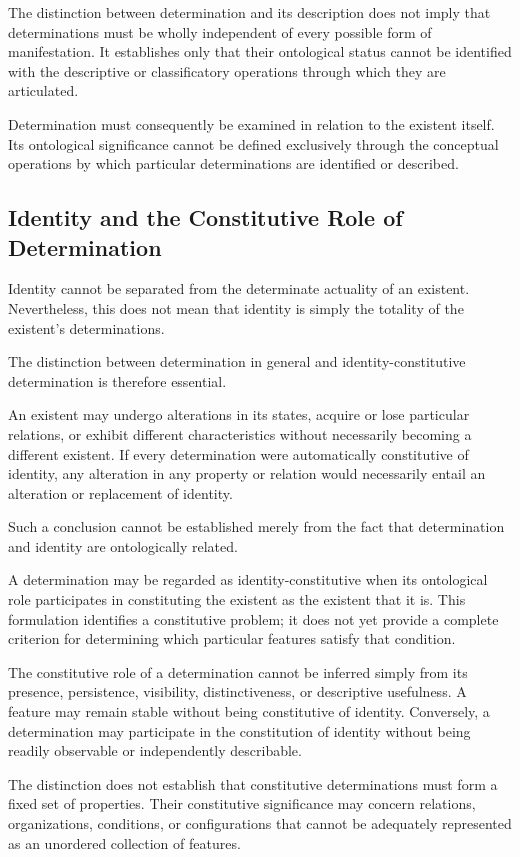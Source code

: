 The distinction between determination and its description
does not imply that determinations must be wholly independent
of every possible form of manifestation. It establishes only
that their ontological status cannot be identified with the
descriptive or classificatory operations through which they
are articulated.

Determination must consequently be examined in relation
to the existent itself. Its ontological significance cannot
be defined exclusively through the conceptual operations
by which particular determinations are identified or described.

\subsection{Identity and the Constitutive Role of Determination}

Identity cannot be separated from the determinate actuality
of an existent. Nevertheless, this does not mean that identity
is simply the totality of the existent's determinations.

The distinction between determination in general and
identity-constitutive determination is therefore essential.

An existent may undergo alterations in its states, acquire
or lose particular relations, or exhibit different characteristics
without necessarily becoming a different existent. If every
determination were automatically constitutive of identity,
any alteration in any property or relation would necessarily
entail an alteration or replacement of identity.

Such a conclusion cannot be established merely from the fact
that determination and identity are ontologically related.

A determination may be regarded as identity-constitutive
when its ontological role participates in constituting the
existent as the existent that it is. This formulation identifies
a constitutive problem; it does not yet provide a complete
criterion for determining which particular features satisfy
that condition.

The constitutive role of a determination cannot be inferred
simply from its presence, persistence, visibility, distinctiveness,
or descriptive usefulness. A feature may remain stable without
being constitutive of identity. Conversely, a determination
may participate in the constitution of identity without being
readily observable or independently describable.

The distinction does not establish that constitutive
determinations must form a fixed set of properties. Their
constitutive significance may concern relations, organizations,
conditions, or configurations that cannot be adequately
represented as an unordered collection of features.

